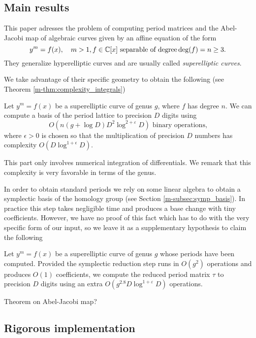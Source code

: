 \documentclass[main.tex]{subfiles}
\begin{document}
  \subsection{Main results}

  This paper adresses the problem of computing period matrices and the
  Abel-Jacobi map of algebraic curves given by an affine equation of the form
  \begin{equation*}
   y^m = f(x), \quad m > 1, f \in \mathbb{C}[x] \text{ separable of degree} \operatorname{deg}(f) = n \ge 3.
  \end{equation*}
  They generalize
  hyperelliptic curves and are usually called \textit{superelliptic curves}.
  
  We take advantage of their specific geometry to obtain the following
  (see Theorem \ref{m-thm:complexity_integrals})
  \begin{thm}
      Let $y^m=f(x)$ be a superelliptic curve of genus $g$,
      where $f$ has degree $n$.
      We can compute a basis of the period lattice to precision
      $D$ digits using $$O(n(g+\log D)D^2\log^{2+\varepsilon} D) \text{ binary operations,}$$
     where $\epsilon>0$ is chosen so that
      the multiplication of precision $D$ numbers has complexity
      $O(D\log^{1+\epsilon}D)$.
  \end{thm}

  This part only involves numerical integration of differentials. We remark
  that this complexity is very favorable in terms of the genus.

  In order
  to obtain standard periods we rely on some linear algebra to obtain a
  symplectic basis of the homology group (see Section \ref{m-subsec:symp_basis}).
  In practice this step takes negligible time
  and produces a base change with tiny coefficients. However, we have no proof
  of this fact which has to do with the very specific form of our input,
  so we leave it as a supplementary hypothesis to claim the
  following
  \begin{thm}
      Let $y^m=f(x)$ be a superelliptic curve of genus $g$ whose periods
      have been computed.
      Provided the symplectic reduction
      step runs in $O(g^2)$ operations and produces $O(1)$ coefficients,
      we compute the reduced period matrix $τ$ to precision $D$
      digits using an extra $O(g^{2.8}D\log^{1+\varepsilon}D)$ operations.
  \end{thm}

  \todo Theorem on Abel-Jacobi map?
  
  
  \subsection{Rigorous implementation}
\end{document}
